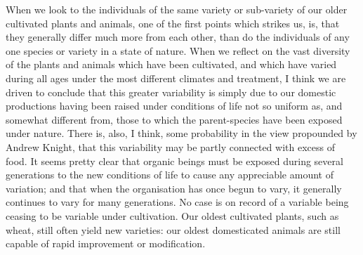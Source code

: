 \documentclass{book}
\begin{document}
When we look to the individuals of the same variety or sub-variety of our older
cultivated plants and animals, one of the first points which strikes us, is,
that they generally differ much more from each other, than do the individuals
of any one species or variety in a state of nature. When we reflect on the vast
diversity of the plants and animals which have been cultivated, and which have
varied during all ages under the most different climates and treatment, I think
we are driven to conclude that this greater variability is simply due to our
domestic productions having been raised under conditions of life not so uniform
as, and somewhat different from, those to which the parent-species have been
exposed under nature. There is, also, I think, some probability in the view
propounded by Andrew Knight, that this variability may be partly connected with
excess of food. It seems pretty clear that organic beings must be exposed
during several generations to the new conditions of life to cause any
appreciable amount of variation; and that when the organisation has once begun
to vary, it generally continues to vary for many generations.
No case is on record of a variable being ceasing to be variable under
cultivation. Our oldest cultivated plants, such as wheat, still often yield new
varieties: our oldest domesticated animals are still capable of rapid
improvement or modification.
\end{document}
